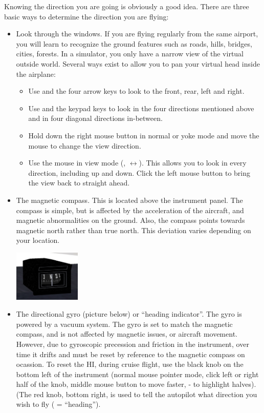 \begin{itemize}
Knowing the direction you are going is obviously a good idea. There are three
basic ways to determine the direction you are flying:
\begin{itemize}
    \item Look through the windows. If you are flying regularly from the same
  airport, you will learn to recognize the ground features such as roads, hills,
  bridges, cities, forests. In a simulator, you only have a narrow view of the
  virtual outside world. Several ways exist to allow you to pan your virtual
  head inside the airplane:
      \begin{itemize}
        \item Use  and the four arrow keys to
      look to the front, rear, left and right.
        \item Use  and the keypad keys to look in the
      four directions mentioned above and in four diagonal directions
      in-between.
        \item Hold down the right mouse button in normal or yoke mode and move
        the  mouse to change the view direction.
        \item Use the mouse in view mode (, $\leftrightarrow$). This
      allows you to look in every direction, including up and down. Click the
      left mouse button to bring the view back to straight ahead.
    \end{itemize}
 \item The magnetic compass. This is located above the instrument panel. The
 compass is simple, but is affected by the acceleration of the aircraft, and
 magnetic abnormalities on the ground. Also, the compass points towards magnetic
 north rather than true north. This deviation varies depending on your location.

\begin{center}
\includegraphics[width=0.25\textwidth]{img/tut_36}
\end{center}


  \item The directional gyro (picture below) or ``heading indicator''. The
  gyro is powered by a vacuum system. The gyro is set to match the magnetic
  compass, and is not affected by magnetic issues, or aircraft movement.
  However, due to gyroscopic precession and friction in the instrument, over
  time it drifts and must be reset by reference to the magnetic compass on
  ocassion. To reset the HI, during cruise flight, use the black knob on the
  bottom left of the instrument
  (normal mouse pointer mode, click left or right half of the knob, middle
  mouse button to move faster, - to highlight halves).
  (The red knob, bottom right, is used to tell the autopilot what direction
  you wish to fly (\textcolor{red}{} = ``heading'').


\end{itemize}
\end{itemize}
